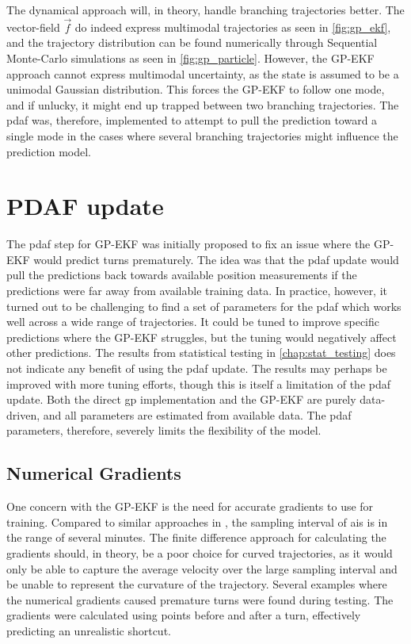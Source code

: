 The dynamical approach will, in theory, handle branching trajectories better. The vector-field $\vec{f}$ do indeed express multimodal trajectories as seen in \cref{fig:gp_ekf}, and the trajectory distribution can be found numerically through Sequential Monte-Carlo simulations as seen in \cref{fig:gp_particle}. However, the GP-EKF approach cannot express multimodal uncertainty, as the state is assumed to be a unimodal Gaussian distribution. This forces the GP-EKF to follow one mode, and if unlucky, it might end up trapped between two branching trajectories. The \acrshort{pdaf} was, therefore, implemented to attempt to pull the prediction toward a single mode in the cases where several branching trajectories might influence the prediction model. 

\section{PDAF update}
The \acrshort{pdaf} step for GP-EKF was initially proposed to fix an issue where the GP-EKF would predict turns prematurely. The idea was that the \acrshort{pdaf} update would pull the predictions back towards available position measurements if the predictions were far away from available training data. In practice, however, it turned out to be challenging to find a set of parameters for the \acrshort{pdaf} which works well across a wide range of trajectories. It could be tuned to improve specific predictions where the GP-EKF struggles, but the tuning would negatively affect other predictions. The results from statistical testing in \cref{chap:stat_testing} does not indicate any benefit of using the \acrshort{pdaf} update. The results may perhaps be improved with more tuning efforts, though this is itself a limitation of the \acrshort{pdaf} update. Both the direct \acrshort{gp} implementation and the GP-EKF are purely data-driven, and all parameters are estimated from available data. The \acrshort{pdaf} parameters, therefore, severely limits the flexibility of the model. 

\subsection{Numerical Gradients}
One concern with the GP-EKF is the need for accurate gradients to use for training. Compared to similar approaches in \cite{vehicle_gp_prediction,pedestrian}, the sampling interval of \acrshort{ais} is in the range of several minutes. The finite difference approach for calculating the gradients should, in theory, be a poor choice for curved trajectories, as it would only be able to capture the average velocity over the large sampling interval and be unable to represent the curvature of the trajectory. Several examples where the numerical gradients caused premature turns were found during testing. The gradients were calculated using points before and after a turn, effectively predicting an unrealistic shortcut.  

